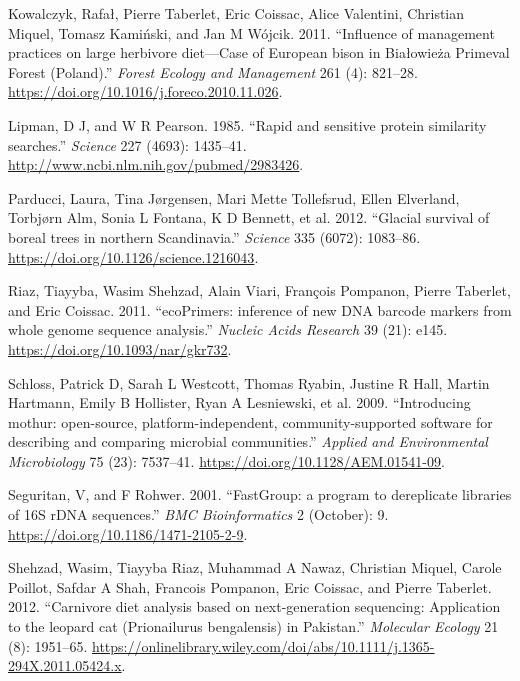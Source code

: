 \documentclass[
  letterpaper,
  DIV=11,
  numbers=noendperiod]{scrreprt}
\newlength{\cslhangindent}
\newlength{\cslentryspacingunit} %
\newenvironment{CSLReferences}[2] %
 {%
  \setlength{\parindent}{0pt}
  \ifodd #1
  \let\oldpar\par
  \def\par{\hangindent=\cslhangindent\oldpar}
  \fi
  \setlength{\parskip}{#2\cslentryspacingunit}
 }%
 {}
\begin{document}
\begin{CSLReferences}{1}{0}
\leavevmode{}%
Kowalczyk, Rafał, Pierre Taberlet, Eric Coissac, Alice Valentini,
Christian Miquel, Tomasz Kamiński, and Jan M Wójcik. 2011. {``{Influence
of management practices on large herbivore diet---Case of European bison
in Bia{ł}owie{ż}a Primeval Forest (Poland)}.''} \emph{Forest Ecology and
Management} 261 (4): 821--28.
\url{https://doi.org/10.1016/j.foreco.2010.11.026}.

\leavevmode{}%
Lipman, D J, and W R Pearson. 1985. {``{Rapid and sensitive protein
similarity searches}.''} \emph{Science} 227 (4693): 1435--41.
\url{http://www.ncbi.nlm.nih.gov/pubmed/2983426}.

\leavevmode{}%
Parducci, Laura, Tina Jørgensen, Mari Mette Tollefsrud, Ellen Elverland,
Torbjørn Alm, Sonia L Fontana, K D Bennett, et al. 2012. {``{Glacial
survival of boreal trees in northern Scandinavia}.''} \emph{Science} 335
(6072): 1083--86. \url{https://doi.org/10.1126/science.1216043}.

\leavevmode{}%
Riaz, Tiayyba, Wasim Shehzad, Alain Viari, François Pompanon, Pierre
Taberlet, and Eric Coissac. 2011. {``{ecoPrimers: inference of new DNA
barcode markers from whole genome sequence analysis}.''} \emph{Nucleic
Acids Research} 39 (21): e145. \url{https://doi.org/10.1093/nar/gkr732}.

\leavevmode{}%
Schloss, Patrick D, Sarah L Westcott, Thomas Ryabin, Justine R Hall,
Martin Hartmann, Emily B Hollister, Ryan A Lesniewski, et al. 2009.
{``{Introducing mothur: open-source, platform-independent,
community-supported software for describing and comparing microbial
communities}.''} \emph{Applied and Environmental Microbiology} 75 (23):
7537--41. \url{https://doi.org/10.1128/AEM.01541-09}.

\leavevmode{}%
Seguritan, V, and F Rohwer. 2001. {``{FastGroup: a program to
dereplicate libraries of 16S rDNA sequences}.''} \emph{BMC
Bioinformatics} 2 (October): 9.
\url{https://doi.org/10.1186/1471-2105-2-9}.

\leavevmode{}%
Shehzad, Wasim, Tiayyba Riaz, Muhammad A Nawaz, Christian Miquel, Carole
Poillot, Safdar A Shah, Francois Pompanon, Eric Coissac, and Pierre
Taberlet. 2012. {``{Carnivore diet analysis based on next-generation
sequencing: Application to the leopard cat (Prionailurus bengalensis) in
Pakistan}.''} \emph{Molecular Ecology} 21 (8): 1951--65.
\url{https://onlinelibrary.wiley.com/doi/abs/10.1111/j.1365-294X.2011.05424.x}.


\end{CSLReferences}
\end{document}
